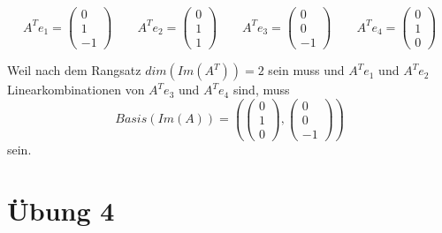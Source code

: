 \documentclass[a4paper,10pt]{article}
\begin{document}
\begin{equation*}
 A^T e_1 =
  \begin{pmatrix}
   0\\
   1\\
   -1
  \end{pmatrix}
 \qquad
 A^T e_2 =
  \begin{pmatrix}
   0\\
   1\\
   1
  \end{pmatrix}
 \qquad
 A^T e_3 =
  \begin{pmatrix}
   0\\
   0\\
   -1
  \end{pmatrix}
 \qquad
 A^T e_4 =
  \begin{pmatrix}
   0\\
   1\\
   0
  \end{pmatrix}
\end{equation*}

Weil nach dem Rangsatz $dim(Im(A^T)) = 2$ sein muss und $A^T e_1$ und $A^T e_2$ Linearkombinationen von $A^T e_3$ und $A^T e_4$ sind, muss
\begin{equation}
 Basis(Im(A)) = \left(
  \begin{pmatrix}
   0\\
   1\\
   0
  \end{pmatrix},
  \begin{pmatrix}
   0\\
   0\\
   -1
  \end{pmatrix}
 \right)
\end{equation}
sein.

\section*{Übung 4}
\end{document}
